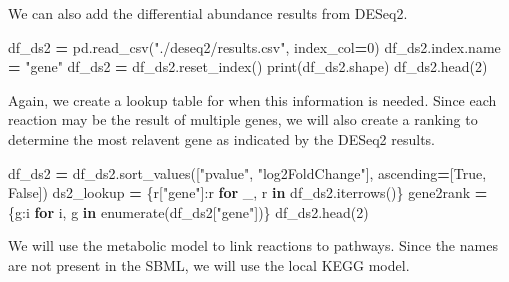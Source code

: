 \documentclass[
]{book}
\newenvironment{Shaded}{\begin{snugshade}}{\end{snugshade}}
\newcommand{\BuiltInTok}[1]{#1}
\newcommand{\ControlFlowTok}[1]{\textcolor[rgb]{0.13,0.29,0.53}{\textbf{#1}}}
\newcommand{\DecValTok}[1]{\textcolor[rgb]{0.00,0.00,0.81}{#1}}
\newcommand{\KeywordTok}[1]{\textcolor[rgb]{0.13,0.29,0.53}{\textbf{#1}}}
\newcommand{\NormalTok}[1]{#1}
\newcommand{\OperatorTok}[1]{\textcolor[rgb]{0.81,0.36,0.00}{\textbf{#1}}}
\newcommand{\StringTok}[1]{\textcolor[rgb]{0.31,0.60,0.02}{#1}}
\newcommand{\VariableTok}[1]{\textcolor[rgb]{0.00,0.00,0.00}{#1}}
\begin{document}
We can also add the differential abundance results from DESeq2.

\begin{Shaded}
\begin{Highlighting}[numbers=left,,]
\NormalTok{df\_ds2 }\OperatorTok{=}\NormalTok{ pd.read\_csv(}\StringTok{"./deseq2/results.csv"}\NormalTok{, index\_col}\OperatorTok{=}\DecValTok{0}\NormalTok{)}
\NormalTok{df\_ds2.index.name }\OperatorTok{=} \StringTok{"gene"}
\NormalTok{df\_ds2 }\OperatorTok{=}\NormalTok{ df\_ds2.reset\_index()}
\BuiltInTok{print}\NormalTok{(df\_ds2.shape)}
\NormalTok{df\_ds2.head(}\DecValTok{2}\NormalTok{)}
\end{Highlighting}
\end{Shaded}

Again, we create a lookup table for when this information is needed.
Since each reaction may be the result of multiple genes, we will also create a ranking to determine
the most relavent gene as indicated by the DESeq2 results.

\begin{Shaded}
\begin{Highlighting}[numbers=left,,]
\NormalTok{df\_ds2 }\OperatorTok{=}\NormalTok{ df\_ds2.sort\_values([}\StringTok{"pvalue"}\NormalTok{, }\StringTok{"log2FoldChange"}\NormalTok{], ascending}\OperatorTok{=}\NormalTok{[}\VariableTok{True}\NormalTok{, }\VariableTok{False}\NormalTok{])}
\NormalTok{ds2\_lookup }\OperatorTok{=}\NormalTok{ \{r[}\StringTok{"gene"}\NormalTok{]:r }\ControlFlowTok{for}\NormalTok{ \_, r }\KeywordTok{in}\NormalTok{ df\_ds2.iterrows()\}}
\NormalTok{gene2rank }\OperatorTok{=}\NormalTok{ \{g:i }\ControlFlowTok{for}\NormalTok{ i, g }\KeywordTok{in} \BuiltInTok{enumerate}\NormalTok{(df\_ds2[}\StringTok{"gene"}\NormalTok{])\}}
\NormalTok{df\_ds2.head(}\DecValTok{2}\NormalTok{)}
\end{Highlighting}
\end{Shaded}

We will use the metabolic model to link reactions to pathways. Since the names are not present in the SBML,
we will use the local KEGG model.
\end{document}
